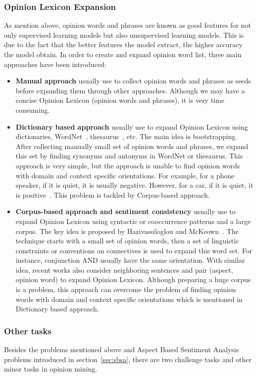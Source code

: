 \documentclass{article}
\begin{document}
\subsubsection{Opinion Lexicon Expansion}
As mention above, opinion words and phrases are known as good features for not only supervised learning models but also unsupervised learning models.
This is due to the fact that the better features the model extract, the higher accuracy the model obtain.
In order to create and expand opinion word list, three main approaches have been introduced:
\begin{itemize}
	\item \textbf{Manual approach} usually use to collect opinion words and phrases as seeds before expanding them through other approaches. Although we may have a concise Opinion Lexicon (opinion words and phrases), it is very time consuming.
	\item \textbf{Dictionary based approach} usually use to expand Opinion Lexicon using dictionaries, WordNet~\cite{69}, thesaurus~\cite{71}, etc.
		 The main idea is bootstrapping. 
		 After collecting manually small set of opinion words and phrases, we expand this set by finding synonyms and antonyms in WordNet or thesaurus. 
		 This approach is very simple, but the approach is unable to find opinion words with domain and context specific orientations. For example, for a  phone speaker, if it is quiet, it is usually negative. 
		 However, for a car, if it is quiet, it is positive~\cite{Liu2012}. This problem is tackled by Corpus-based approach.
	\item \textbf{Corpus-based approach and sentiment consistency} usually use to expand Opinion Lexicon using syntactic or cooccurrence patterns and a large corpus. 
		The key idea is proposed by Hazivassiloglou and McKeown~\cite{29}. 
		The technique starts with a small set of opinion words, then a set of linguistic constraints or conventions on connectives is used to expand this word set. 
		For instance, conjunction AND usually have the same orientation. 
		With similar idea, recent works also consider neighboring sentences and pair (aspect, opinion word) to expand Opinion Lexicon. 
		Although preparing a huge corpus is a problem, this approach can overcome the problem of finding opinion words with domain and context specific orientations which is mentioned in Dictionary based approach.
\end{itemize}

\subsubsection{Other tasks}
Besides the problems mentioned above and Aspect Based Sentiment Analysis problems introduced in section~\ref{sec:sbsa}, there are two challenge  tasks and other minor tasks in opinion mining.
\end{document}
